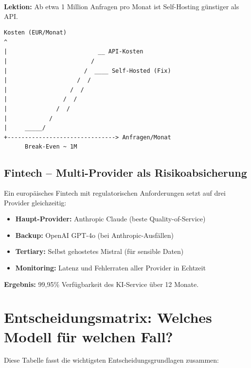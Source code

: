 \textbf{Lektion:} Ab etwa 1 Million Anfragen pro Monat ist Self-Hosting günstiger als API.

\begin{verbatim}
Kosten (EUR/Monat)
^
|                          __ API-Kosten
|                        /
|                      /  ____ Self-Hosted (Fix)
|                    /  /
|                  /  /
|                /  /
|              /  /
|            /
|     _____/
+-------------------------------> Anfragen/Monat
      Break-Even ~ 1M
\end{verbatim}

\subsection{Fintech -- Multi-Provider als Risikoabsicherung}

Ein europäisches Fintech mit regulatorischen Anforderungen setzt auf drei Provider gleichzeitig:

\begin{itemize}[leftmargin=*]
    \item \textbf{Haupt-Provider:} Anthropic Claude (beste Quality-of-Service)
    \item \textbf{Backup:} OpenAI GPT-4o (bei Anthropic-Ausfällen)
    \item \textbf{Tertiary:} Selbst gehostetes Mistral (für sensible Daten)
    \item \textbf{Monitoring:} Latenz und Fehlerraten aller Provider in Echtzeit
\end{itemize}

\textbf{Ergebnis:} 99,95\% Verfügbarkeit des KI-Service über 12 Monate.


\section{Entscheidungsmatrix: Welches Modell für welchen Fall?}

Diese Tabelle fasst die wichtigsten Entscheidungsgrundlagen zusammen:

